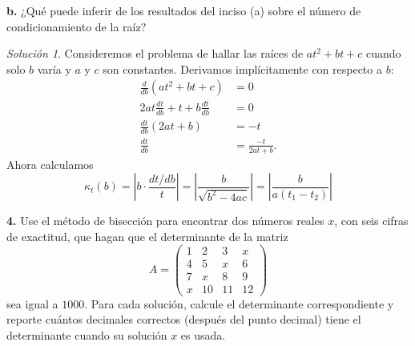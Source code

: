\documentclass{article}
\newenvironment{statement}[1]{\smallskip\noindent\color[rgb]{1.00,0.00,0.50} {\bf #1.}}{}
\theoremstyle{definition}
\theoremstyle{remark}
\newtheorem*{solution}{Soluci\'on}
\begin{document}
\begin{statement}{b}
  ¿Qu\'e puede inferir de los resultados del inciso (a) sobre el n\'umero de
  condicionamiento de la ra\'iz?
\end{statement}

\begin{solution}
  Consideremos el problema de hallar las ra\'ices de $at^2 + bt + c$ cuando
  solo $b$ var\'ia y $a$ y $c$ son constantes. Derivamos impl\'icitamente con
  respecto a $b$:
  \begin{align*}
    \frac{d}{db} (at^2 + bt + c) &= 0\\
    2at\frac{dt}{db} + t + b \frac{dt}{db} &= 0\\
    \frac{dt}{db}(2at + b) &= -t\\
    \frac{dt}{db} &= \frac{-t}{2at + b}.
  \end{align*}
  Ahora calculamos
  \[
    \kappa_t(b) = \left|b \cdot \frac{dt / db}{t}\right| = \left|\frac{b}{\sqrt{b^2 - 4ac}}\right|
    = \left|\frac{b}{a (t_1 - t_2)}\right|
  \]
\end{solution}

\begin{statement}{4}
  Use el m\'etodo de bisecci\'on para encontrar dos n\'umeros reales $x$, con
  seis cifras de exactitud, que hagan que el determinante de la matriz
  \[
    A = \begin{pmatrix}
      1 & 2 & 3 & x \\
      4 & 5 & x & 6 \\
      7 & x & 8 & 9 \\
      x & 10 & 11 & 12
    \end{pmatrix}  
  \]
  sea igual a $1000$. Para cada soluci\'on, calcule el determinante
  correspondiente y reporte cu\'antos decimales correctos (despu\'es del punto
  decimal) tiene el determinante cuando su soluci\'on $x$ es usada.
\end{statement}
\end{document}
